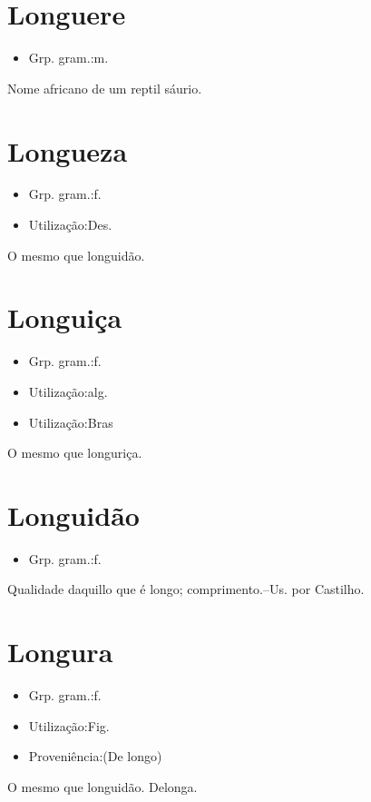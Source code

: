 \section{Longuere}
\begin{itemize}
\item {Grp. gram.:m.}
\end{itemize}
Nome africano de um reptil sáurio.
\section{Longueza}
\begin{itemize}
\item {Grp. gram.:f.}
\end{itemize}
\begin{itemize}
\item {Utilização:Des.}
\end{itemize}
O mesmo que \textunderscore longuidão\textunderscore .
\section{Longuiça}
\begin{itemize}
\item {Grp. gram.:f.}
\end{itemize}
\begin{itemize}
\item {Utilização:alg.}
\end{itemize}
\begin{itemize}
\item {Utilização:Bras}
\end{itemize}
O mesmo que \textunderscore longuriça\textunderscore .
\section{Longuidão}
\begin{itemize}
\item {Grp. gram.:f.}
\end{itemize}
Qualidade daquillo que é longo; comprimento.--Us. por Castilho.
\section{Longura}
\begin{itemize}
\item {Grp. gram.:f.}
\end{itemize}
\begin{itemize}
\item {Utilização:Fig.}
\end{itemize}
\begin{itemize}
\item {Proveniência:(De \textunderscore longo\textunderscore )}
\end{itemize}
O mesmo que \textunderscore longuidão\textunderscore .
Delonga.
